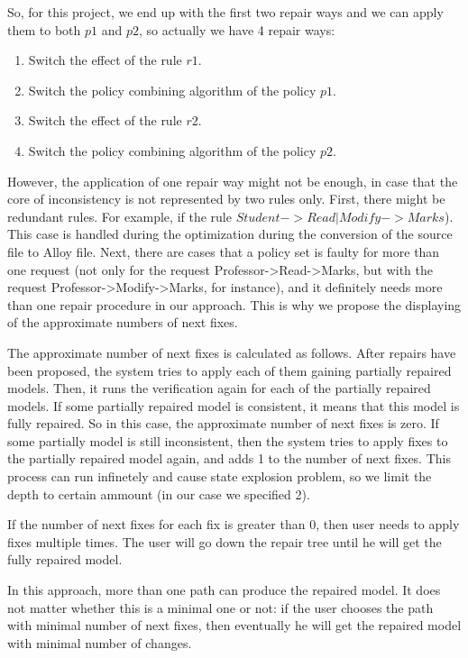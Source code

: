 \documentclass{acm_proc_article-sp}
\begin{document}
So, for this project, we end up with the first two repair ways and we can apply them to both $p1$ and $p2$, so actually we have 4 repair ways:

\begin{enumerate}
\item Switch the effect of the rule $r1$.
\item Switch the policy combining algorithm of the policy $p1$.
\item Switch the effect of the rule $r2$.
\item Switch the policy combining algorithm of the policy $p2$.
\end{enumerate}

However, the application of one repair way might not be enough, in case that the core of inconsistency is not represented by two rules only. First, there might be redundant rules. For example, if the rule $Student->Read|Modify -> Marks$). This case is handled during the optimization during the conversion of the source file to Alloy file. Next, there are cases that a policy set is faulty for more than one request (not only for the request Professor->Read->Marks, but with the request  Professor->Modify->Marks, for instance), and it definitely needs more than one repair procedure in our approach. This is why we propose the displaying of the approximate numbers of next fixes.

The approximate number of next fixes is calculated as follows. After repairs have been proposed, the system tries to apply each of them gaining partially repaired models. Then, it runs the verification again for each of the partially repaired models. If some partially repaired model is consistent, it means that this model is fully repaired. So in this case, the approximate number of next fixes is zero. If some partially model is still inconsistent, then the system tries to apply fixes to the partially repaired model again, and adds 1 to the number of next fixes. This process can run infinetely and cause state explosion problem, so we limit the depth to certain ammount (in our case we specified 2).

If the number of next fixes for each fix is greater than 0, then user needs to apply fixes multiple times. The user will go down the repair tree until he will get the fully repaired model.

In this approach, more than one path can produce the repaired model. It does not matter whether this is a minimal one or not: if the user chooses the path with minimal number of next fixes, then eventually he will get the repaired model with minimal number of changes.
\end{document}
